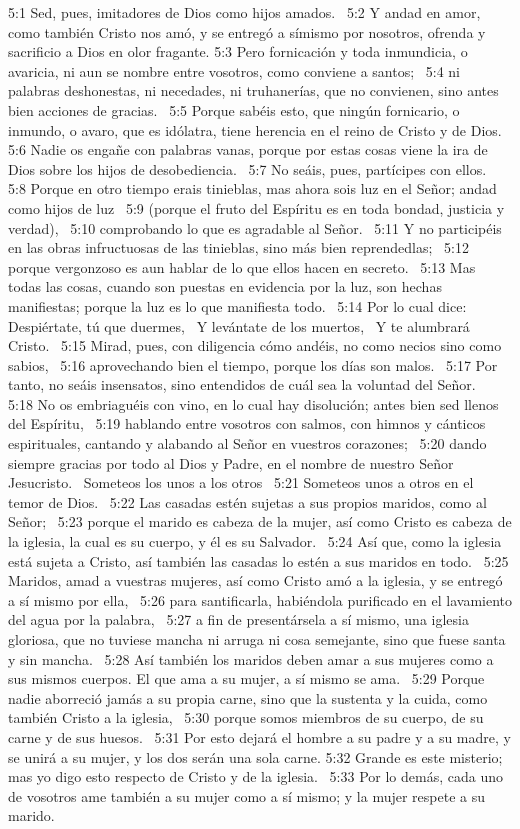 5:1 Sed, pues, imitadores de Dios como hijos amados.  
5:2 Y andad en amor, como también Cristo nos amó, y se entregó a símismo por nosotros, ofrenda y sacrificio a Dios en olor fragante. 
5:3 Pero fornicación y toda inmundicia, o avaricia, ni aun se nombre entre vosotros, como conviene a santos;  
5:4 ni palabras deshonestas, ni necedades, ni truhanerías, que no convienen, sino antes bien acciones de gracias.  
5:5 Porque sabéis esto, que ningún fornicario, o inmundo, o avaro, que es idólatra, tiene herencia en el reino de Cristo y de Dios.  
5:6 Nadie os engañe con palabras vanas, porque por estas cosas viene la ira de Dios sobre los hijos de desobediencia.  
5:7 No seáis, pues, partícipes con ellos.  
5:8 Porque en otro tiempo erais tinieblas, mas ahora sois luz en el Señor; andad como hijos de luz  
5:9 (porque el fruto del Espíritu es en toda bondad, justicia y verdad),  
5:10 comprobando lo que es agradable al Señor.  
5:11 Y no participéis en las obras infructuosas de las tinieblas, sino más bien reprendedlas;  
5:12 porque vergonzoso es aun hablar de lo que ellos hacen en secreto.  
5:13 Mas todas las cosas, cuando son puestas en evidencia por la luz, son hechas manifiestas; porque la luz es lo que manifiesta todo.  
5:14 Por lo cual dice:  
Despiértate, tú que duermes,  
Y levántate de los muertos,  
Y te alumbrará Cristo.  
5:15 Mirad, pues, con diligencia cómo andéis, no como necios sino como sabios,  
5:16 aprovechando bien el tiempo, porque los días son malos.  
5:17 Por tanto, no seáis insensatos, sino entendidos de cuál sea la voluntad del Señor.  
5:18 No os embriaguéis con vino, en lo cual hay disolución; antes bien sed llenos del Espíritu,  
5:19 hablando entre vosotros con salmos, con himnos y cánticos espirituales, cantando y alabando al Señor en vuestros corazones;  
5:20 dando siempre gracias por todo al Dios y Padre, en el nombre de nuestro Señor Jesucristo.  
Someteos los unos a los otros 
5:21 Someteos unos a otros en el temor de Dios.  
5:22 Las casadas estén sujetas a sus propios maridos, como al Señor;  
5:23 porque el marido es cabeza de la mujer, así como Cristo es cabeza de la iglesia, la cual es su cuerpo, y él es su Salvador.  
5:24 Así que, como la iglesia está sujeta a Cristo, así también las casadas lo estén a sus maridos en todo.  
5:25 Maridos, amad a vuestras mujeres, así como Cristo amó a la iglesia, y se entregó a sí mismo por ella,  
5:26 para santificarla, habiéndola purificado en el lavamiento del agua por la palabra,  
5:27 a fin de presentársela a sí mismo, una iglesia gloriosa, que no tuviese mancha ni arruga ni cosa semejante, sino que fuese santa y sin mancha.  
5:28 Así también los maridos deben amar a sus mujeres como a sus mismos cuerpos. El que ama a su mujer, a sí mismo se ama.  
5:29 Porque nadie aborreció jamás a su propia carne, sino que la sustenta y la cuida, como también Cristo a la iglesia,  
5:30 porque somos miembros de su cuerpo, de su carne y de sus huesos.  
5:31 Por esto dejará el hombre a su padre y a su madre, y se unirá a su mujer, y los dos serán una sola carne. 
5:32 Grande es este misterio; mas yo digo esto respecto de Cristo y de la iglesia.  
5:33 Por lo demás, cada uno de vosotros ame también a su mujer como a sí mismo; y la mujer respete a su marido.  

